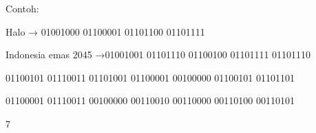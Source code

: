 \documentclass{article}
\begin{document}

Contoh: 

Halo → 01001000 01100001 01101100 01101111

Indonesia emas 2045 →01001001 01101110 01100100 01101111 01101110 

01100101 01110011 01101001 01100001 00100000 01100101 01101101 

01100001 01110011 00100000 00110010 00110000 00110100 00110101

7
\end{document}
